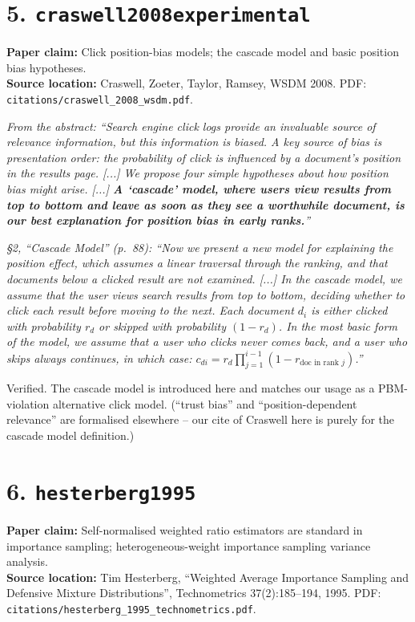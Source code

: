 \documentclass[11pt]{article}
\newcommand{\paperclaim}[1]{\textbf{Paper claim:} #1}
\newcommand{\source}[1]{\textbf{Source location:} #1}
\newcommand{\quoted}[1]{\begin{tcolorbox}\textit{#1}\end{tcolorbox}}
\begin{document}
\bigskip

\section*{5. \texttt{craswell2008experimental}}
\paperclaim{Click position-bias models; the cascade model and basic position
bias hypotheses.}\\
\source{Craswell, Zoeter, Taylor, Ramsey, WSDM 2008. PDF:
\texttt{citations/craswell\_2008\_wsdm.pdf}.}

\quoted{From the abstract: ``Search engine click logs provide an invaluable
source of relevance information, but this information is biased. A key
source of bias is presentation order: the probability of click is
influenced by a document's position in the results page. [...] We
propose four simple hypotheses about how position bias might arise. [...]
\textbf{A `cascade' model, where users view results from top to bottom and
leave as soon as they see a worthwhile document, is our best explanation
for position bias in early ranks.}''}

\quoted{\S2, ``Cascade Model'' (p.~88): ``Now we present a new model for
explaining the position effect, which assumes a linear traversal through
the ranking, and that documents below a clicked result are not examined.
[...] In the cascade model, we assume that the user views search results
from top to bottom, deciding whether to click each result before moving
to the next. Each document $d_i$ is either clicked with probability $r_d$
or skipped with probability $(1-r_d)$. In the most basic form of the
model, we assume that a user who clicks never comes back, and a user who
skips always continues, in which case:
$c_{di} = r_d \prod_{j=1}^{i-1}(1 - r_{\text{doc in rank }j})$.''}

\noindent Verified. The cascade model is introduced here and matches our
usage as a PBM-violation alternative click model.
(``trust bias'' and ``position-dependent relevance'' are formalised
elsewhere -- our cite of Craswell here is purely for the cascade model
definition.)

\bigskip

\section*{6. \texttt{hesterberg1995}}
\paperclaim{Self-normalised weighted ratio estimators are standard in
importance sampling; heterogeneous-weight importance sampling variance
analysis.}\\
\source{Tim Hesterberg, ``Weighted Average Importance Sampling and
Defensive Mixture Distributions'', Technometrics 37(2):185--194, 1995.
PDF: \texttt{citations/hesterberg\_1995\_technometrics.pdf}.}
\end{document}
